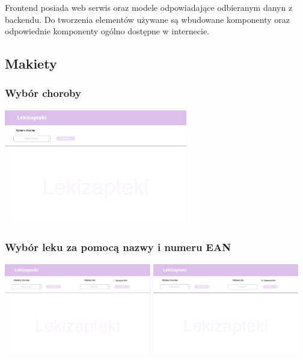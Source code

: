 \documentclass{article}
\begin{document}
  Frontend posiada web serwis oraz modele odpowiadające odbieranym danyn z backendu.
  Do tworzenia elementów używane są wbudowane komponenty oraz odpowiednie komponenty ogólno dostępne w internecie.

    \subsection{Makiety}
      \subsubsection{Wybór choroby}
      \includegraphics[width=8cm, height=5cm]{lekizapteki-wybor-choroby}

      \subsubsection{Wybór leku za pomocą nazwy i numeru EAN}
      \includegraphics[width=6.4cm, height=4cm]{lekizapteki-wybor-leku-nazwa}
      \includegraphics[width=6.4cm, height=4cm]{lekizapteki-wybor-leku-ean}
\end{document}
